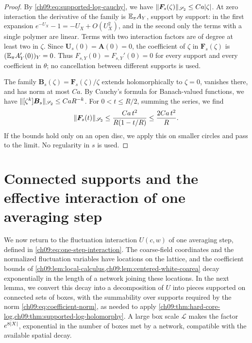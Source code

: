 \begin{proof}
By \eqref{ch09:eq:supported-log-cauchy}, we have $\lVert \boldsymbol F_s(\zeta)\rVert_{\mathscr S_2}\le Ca\lvert \zeta\rvert$. At zero interaction the derivative of the family is $\mathbb E_\pi A_Y$, support by support: in the first expansion $e^{-U_X}-1=-U_X+O(U_X^2)$, and in the second only the terms with a single polymer are linear. Terms with two interaction factors are of degree at least two in $\zeta$. Since $\boldsymbol U_s(0)=\boldsymbol A(0)=0$, the coefficient of $\zeta$ in $\boldsymbol F_s(\zeta)$ is $(\mathbb E_\pi A_Y'(0))_Y=0$. Thus $F_{s,Y}(0)=F_{s,Y}'(0)=0$ for every support and every coefficient in $\theta$; no cancellation between different supports is used.

The family $\boldsymbol B_s(\zeta)=\boldsymbol F_s(\zeta)/\zeta$ extends holomorphically to $\zeta=0$, vanishes there, and has norm at most $Ca$. By Cauchy's formula for Banach-valued functions, we have $\lVert [\zeta^k]\boldsymbol B_s\rVert_{\mathscr S_2}\le CaR^{-k}$. For $0<t\le R/2$, summing the series, we find
\[
 \lVert \boldsymbol F_s(t)\rVert_{\mathscr S_2}\le\frac{Ca\,t^2}{R(1-t/R)}\le\frac{2Ca\,t^2}{R}.
\]
If the bounds hold only on an open disc, we apply this on smaller circles and pass to the limit. No regularity in $s$ is used.
\end{proof}

\section{Connected supports and the effective interaction of one averaging step}\label{ch09:sec:one-step}

We now return to the fluctuation interaction $U(c,w)$ of one averaging step, defined in \eqref{ch09:eq:one-step-interaction}. The coarse-field coordinates and the normalized fluctuation variables have locations on the lattice, and the coefficient bounds of \cref{ch09:lem:local-calculus,ch09:lem:centered-white-coarea} decay exponentially in the length of a network joining these locations. In the next lemma, we convert this decay into a decomposition of $U$ into pieces supported on connected sets of boxes, with the summability over supports required by the norm \eqref{ch09:eq:coefficient-norm}, as needed to apply \cref{ch09:thm:hard-core-log,ch09:thm:supported-log-holomorphy}. A large box scale $\mathscr L$ makes the factor $e^{8\lvert X\rvert}$, exponential in the number of boxes met by a network, compatible with the available spatial decay.

